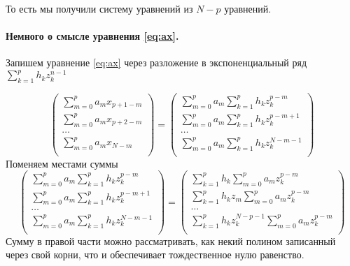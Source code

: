 \documentclass[a4paper,14pt]{extarticle}
\begin{document}
То есть мы получили систему уравнений из $N-p$ уравнений.

\paragraph{Немного о смысле уравнения \eqref{eq:ax}.}
Запишем уравнение \eqref{eq:ax} через разложение в экспоненциальный ряд
$\sum\limits_{k=1}^{p} h_k z_k^{n-1}$

 \begin{equation}
    \begin{pmatrix}
        \sum\limits_{m=0}^{p} a_m x_{p+1-m} \\ 
        \sum\limits_{m=0}^{p} a_m x_{p+2-m} \\ 
        \dots \\ 
        \sum\limits_{m=0}^{p} a_m x_{N-m} \\ 
    \end{pmatrix}
    =
    \begin{pmatrix}
        \sum\limits_{m=0}^{p} a_m \sum\limits_{k=1}^{p} h_k z_k^{p-m} \\ 
        \sum\limits_{m=0}^{p} a_m \sum\limits_{k=1}^{p} h_k z_k^{p-m+1}\\ 
        \dots \\ 
        \sum\limits_{m=0}^{p}  a_m \sum\limits_{k=1}^{p} h_k z_k^{N-m -1}\\ 
    \end{pmatrix}
\end{equation}
Поменяем местами суммы
\begin{equation}
    \label{eq:}
    \begin{pmatrix}
        \sum\limits_{m=0}^{p} a_m \sum\limits_{k=1}^{p} h_k z_k^{p-m} \\ 
        \sum\limits_{m=0}^{p} a_m \sum\limits_{k=1}^{p} h_k z_k^{p-m+1}\\ 
        \dots \\ 
        \sum\limits_{m=0}^{p}  a_m \sum\limits_{k=1}^{p} h_k z_k^{N-m -1}\\ 
    \end{pmatrix}
    =
    \begin{pmatrix}
        \sum\limits_{k=1}^{p} h_k \sum\limits_{m=0}^{p} a_m  z_k^{p-m} \\ 
        \sum\limits_{k=1}^{p} h_k z_m\sum\limits_{m=0}^{p} a_m  z_k^{p-m} \\ 
        \dots \\ 
        \sum\limits_{k=1}^{p} h_k z_k^{N-p-1}\sum\limits_{m=0}^{p} a_m  z_k^{p-m} \\ 
    \end{pmatrix}
\end{equation}
Сумму в правой части можно рассматривать, как некий полином записанный через
свой корни, что и обеспечивает тождественное нулю равенство.
\end{document}
